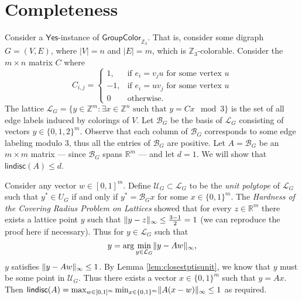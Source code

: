 \documentclass{article}
\DeclarePairedDelimiter\norm{\parallel}{\parallel}
\newcommand\SetL{\mathcal{L}}
\newcommand\B{\mathcal{B}}
\newcommand\U{\mathcal{U}}
\newcommand\R{\mathbb{R}}
\newcommand\Z{\mathbb{Z}}
\newcommand\lindisc{\mathsf{lindisc}}
\newcommand\GroupColor{\mathsf{GroupColor}}
\newcommand\Yes{\mathsf{Yes}}
\begin{document}
\section{Completeness}
Consider a $\Yes$-instance of $\GroupColor_{\Z_3}$. That is, consider some digraph $G = (V, E)$, where $|V| = n$ and $|E| = m$, which is $\Z_3$-colorable. Consider the $m \times n$ matrix $C$ where 
\[C_{i,j} = \begin{cases}
1, &\mbox{if $e_i = v_ju$ for some vertex $u$}\\
-1, &\mbox{if $e_i = uv_j$ for some vertex $u$}\\
0 &\mbox{otherwise.}
\end{cases}\]
The lattice $\SetL_G = \{y \in \Z^m: \exists x \in \Z^n \mbox{ such that } y = Cx \mod 3\}$ is the set of all edge labels induced by colorings of $V$. Let $\B_G$ be the basis of $\SetL_G$ consisting of vectors $y \in \{0,1,2\}^m$. Observe that each column of $\B_G$ corresponds to some edge labeling modulo $3$, thus all the entries of $\B_G$ are positive. Let $A = \B_G$ be an $m \times m$ matrix --- since $\B_G$ spans $\R^m$ --- and let $d = 1$. We will show that $\lindisc(A) \leq d$.  

Consider any vector $w \in [0,1]^{m}$. Define $\U_G \subset \SetL_G$ to be the \emph{unit polytope} of $\SetL_G$ such that $y^* \in U_G$ if and only if $y^* = \B_Gx$ for some $x \in \{0,1\}^{m}$. The \emph{Hardness of the Covering Radius Problem on Lattices} \cite{haviv2006hardness} showed that for every $z \in \R^m$ there exists a lattice point $y$ such that $\norm{y - z}_{\infty} \leq \frac{3-1}{2} = 1$ (we can reproduce the proof here if necessary). Thus for $y \in \SetL_G$ such that
\[y = \arg\min_{y \in \SetL_G} \norm{y - Aw}_{\infty},\]
$y$ satisfies $\norm{y - Aw}_{\infty} \leq 1$. By Lemma \ref{lem:closestptisunit}, we know that $y$ must be some point in $\U_G$. Thus there exists a vector $x \in \{0,1\}^{m}$ such that $y = Ax$. Then $\lindisc(A) = \max_{w \in [0,1]^{m}}\min_{x \in \{0,1\}^{m}} \norm{A(x - w)}_{\infty} \leq 1$ as required.  
\end{document}
